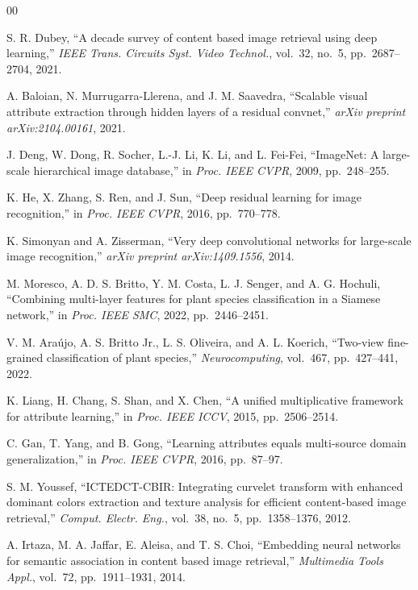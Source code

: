 \documentclass[letterpaper, 10 pt, conference]{ieeeconf}
\begin{document}
\begin{thebibliography}{00}

S. R. Dubey, ``A decade survey of content based image retrieval using deep
learning,'' \emph{IEEE Trans. Circuits Syst. Video Technol.}, vol.~32,
no.~5, pp.~2687--2704, 2021.

A. Baloian, N. Murrugarra-Llerena, and J. M. Saavedra, ``Scalable visual
attribute extraction through hidden layers of a residual convnet,''
\emph{arXiv preprint arXiv:2104.00161}, 2021.

J. Deng, W. Dong, R. Socher, L.-J. Li, K. Li, and L. Fei-Fei,
``ImageNet: A large-scale hierarchical image database,'' in
\emph{Proc. IEEE CVPR}, 2009, pp.~248--255.

K. He, X. Zhang, S. Ren, and J. Sun, ``Deep residual learning for image
recognition,'' in \emph{Proc. IEEE CVPR}, 2016, pp.~770--778.

K. Simonyan and A. Zisserman, ``Very deep convolutional networks for
large-scale image recognition,'' \emph{arXiv preprint arXiv:1409.1556},
2014.

M. Moresco, A. D. S. Britto, Y. M. Costa, L. J. Senger, and
A. G. Hochuli, ``Combining multi-layer features for plant species
classification in a Siamese network,'' in \emph{Proc. IEEE SMC}, 2022,
pp.~2446--2451.

V. M. Araújo, A. S. Britto Jr., L. S. Oliveira, and A. L. Koerich,
``Two-view fine-grained classification of plant species,''
\emph{Neurocomputing}, vol.~467, pp.~427--441, 2022.

K. Liang, H. Chang, S. Shan, and X. Chen, ``A unified multiplicative
framework for attribute learning,'' in \emph{Proc. IEEE ICCV}, 2015,
pp.~2506--2514.

C. Gan, T. Yang, and B. Gong, ``Learning attributes equals multi-source
domain generalization,'' in \emph{Proc. IEEE CVPR}, 2016, pp.~87--97.

S. M. Youssef, ``ICTEDCT-CBIR: Integrating curvelet transform with
enhanced dominant colors extraction and texture analysis for efficient
content-based image retrieval,'' \emph{Comput. Electr. Eng.}, vol.~38,
no.~5, pp.~1358--1376, 2012.

A. Irtaza, M. A. Jaffar, E. Aleisa, and T. S. Choi, ``Embedding neural
networks for semantic association in content based image retrieval,''
\emph{Multimedia Tools Appl.}, vol.~72, pp.~1911--1931, 2014.


\end{thebibliography}
\end{document}
